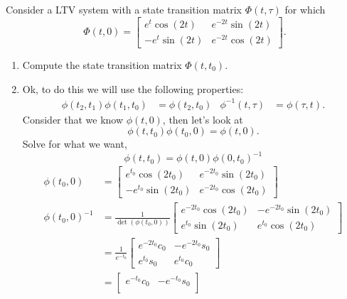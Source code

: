 \documentclass[10pt]{article}
\begin{document}
\section{}
Consider a LTV system with a state transition matrix $\Phi(t,\tau)$ for
which 
\begin{equation*}
  \Phi(t,0) =
  \begin{bmatrix}
    e^t\cos(2t) & e^{-2t}\sin(2t) \\ 
    -e^{t}\sin(2t) & e^{-2t}\cos(2t)
  \end{bmatrix}.
\end{equation*}
\begin{enumerate}[label=(\alph*)]
\item Compute the state transition matrix $\Phi(t,t_0)$.
\item[]
  Ok, to do this we will use the following properties:
  \begin{align}
    \phi(t_2, t_1)\phi(t_1,t_0) &= \phi(t_2, t_0)  & 
    \phi^{-1}(t,\tau) &= \phi(\tau, t).
  \end{align}
Consider that we know $\phi(t,0)$, then let's look at 
\begin{equation*}
  \phi(t,t_0)\phi(t_0,0) = \phi(t,0).
\end{equation*}
Solve for what we want,
\begin{equation*}
  \phi(t,t_0) = \phi(t,0)\phi(0,t_0)^{-1}
\end{equation*}
\begin{align*}
  \phi(t_0,0) & =
  \begin{bmatrix}
    e^{t_0}\cos(2t_0) & e^{-2t_0}\sin(2t_0) \\ 
    -e^{t_0}\sin(2t_0) & e^{-2t_0}\cos(2t_0)
  \end{bmatrix} \\
  \phi(t_0,0)^{-1} & =\frac{1}{\det\left(\phi(t_0,0)\right)}
  \begin{bmatrix}
    e^{-2t_0}\cos(2t_0) & -e^{-2t_0}\sin(2t_0) \\ 
    e^{t_0}\sin(2t_0) & e^{t_0}\cos(2t_0)
  \end{bmatrix} \\
  &=\frac{1}{e^{-t_0}}
  \begin{bmatrix}
    e^{-2t_0}c_0 & -e^{-2t_0}s_0 \\
    e^{t_0}s_0 & e^{t_0}c_0
  \end{bmatrix}\\
  &=
  \begin{bmatrix}
    e^{-t_0}c_0 & -e^{-t_0}s_0 \\

\end{bmatrix}
\end{align*}
\end{enumerate}
\end{document}
